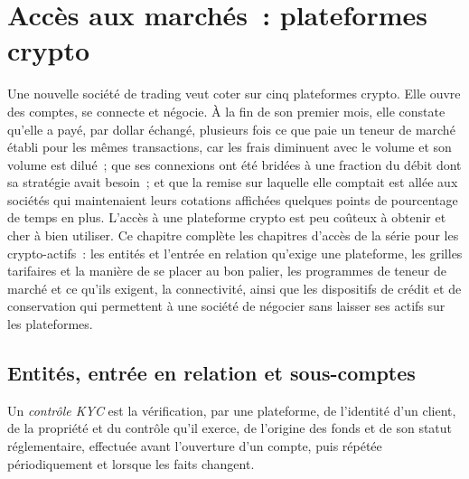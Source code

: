 \chapter{Accès aux marchés~: plateformes crypto}\label{ch:m3:getting-access-crypto-venues}

Une nouvelle société de trading veut coter sur cinq plateformes crypto. Elle ouvre des comptes,
se connecte et négocie. À la fin de son premier mois, elle constate qu'elle a payé, par dollar échangé,
plusieurs fois ce que paie un teneur de marché établi pour les mêmes transactions, car les frais diminuent avec le volume
et son volume est dilué~; que ses connexions ont été bridées à une fraction du débit dont sa stratégie avait besoin~;
et que la remise sur laquelle elle comptait est allée aux sociétés qui maintenaient leurs cotations affichées
quelques points de pourcentage de temps en plus. L'accès à une plateforme crypto est peu coûteux à obtenir et cher à bien utiliser.
Ce chapitre complète les chapitres d'accès de la série pour les crypto-actifs~: les entités et l'entrée en relation qu'exige une plateforme,
les grilles tarifaires et la manière de se placer au bon palier, les programmes de teneur de marché et ce qu'ils exigent,
la connectivité, ainsi que les dispositifs de crédit et de conservation qui permettent à une société de négocier sans laisser ses actifs sur les plateformes.

\section{Entités, entrée en relation et sous-comptes}

\begin{definition}\label{def:m3:getting-access-crypto-venues:kyc}
Un \emph{contrôle KYC} est la vérification, par une plateforme, de l'identité d'un client, de la propriété
et du contrôle qu'il exerce, de l'origine des fonds et de son statut réglementaire, effectuée avant l'ouverture d'un compte, puis répétée périodiquement et lorsque les faits changent.
\end{definition}

